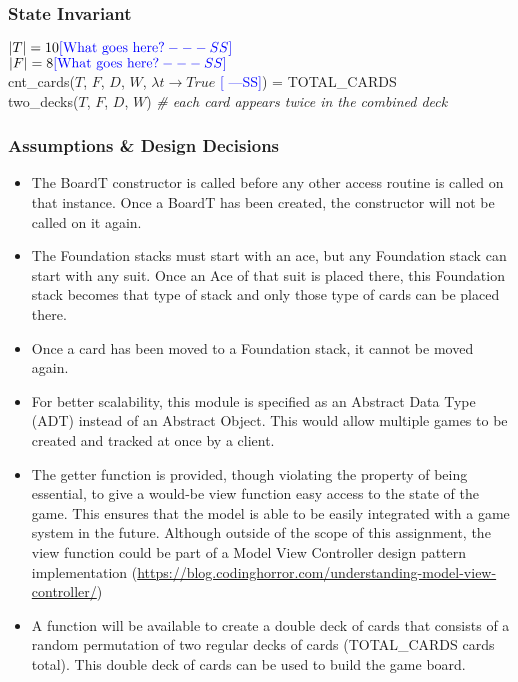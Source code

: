 \documentclass[12pt]{article}
\newcommand{\authornote}[3]{\textcolor{#1}{[#3 ---#2]}}
\newcommand{\authornote}[3]{}
\newcommand{\wss}[1]{\authornote{blue}{SS}{#1}}
\begin{document}
\subsubsection* {State Invariant}

$|T| =10 \wss{\text{What goes here?}}$\\
$|F| = 8\wss{\text{What goes here?}}$\\
cnt\_cards($T$, $F$, $D$, $W$, $\lambda t \rightarrow True$ \wss{}) = TOTAL\_CARDS\\
two\_decks($T$, $F$, $D$, $W$) \textit{\# each card appears twice in the combined deck}

\subsubsection* {Assumptions \& Design Decisions}

\begin{itemize}

\item The BoardT constructor is called before any other access
  routine is called on that instance. Once a BoardT has been created, the
  constructor will not be called on it again.

\item The Foundation stacks must start with an ace, but any Foundation stack can
  start with any suit. Once an Ace of that suit is placed there, this Foundation
  stack becomes that type of stack and only those type of cards can be placed
  there.

\item Once a card has been moved to a Foundation stack, it cannot be moved again.

\item For better scalability, this module is specified as an Abstract Data Type
  (ADT) instead of an Abstract Object. This would allow multiple games to be
  created and tracked at once by a client.

\item The getter function is provided, though violating the property of being
  essential, to give a would-be view function easy access to the state of the
  game. This ensures that the model is able to be easily integrated with a game
  system in the future.  Although outside of the scope of this assignment, the
  view function could be part of a Model View Controller design pattern implementation
  (\url{https://blog.codinghorror.com/understanding-model-view-controller/})

\item A function will be available to create a double deck of cards that
  consists of a random permutation of two regular decks of cards (TOTAL\_CARDS
  cards total).  This double deck of cards can be used to build the game board.

\end{itemize}
\end{document}
